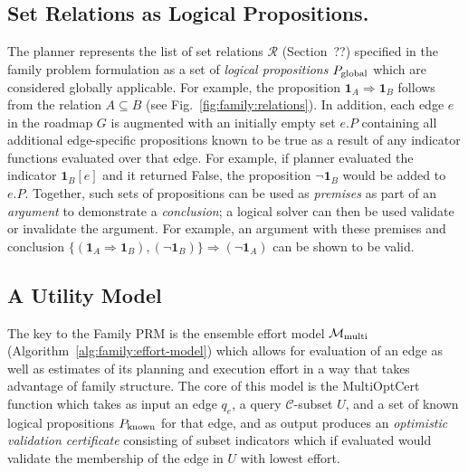 \subsection{Set Relations as Logical Propositions.}
The planner represents the list of set relations $\mathcal{R}$
(Section~??)
specified in the family problem formulation
as a set of \emph{logical propositions} $P_{\mbox{\scriptsize global}}$
which are considered globally applicable.
For example,
the proposition $\mathbf{1}_A \Rightarrow \mathbf{1}_B$
follows from the relation $A \subseteq B$
(see Fig.~\ref{fig:family:relations}).
In addition,
each edge $e$ in the roadmap $G$ is augmented with an initially empty
set $e.P$ containing all additional edge-specific propositions
known to be true as a result of any indicator functions evaluated
over that edge.
For example,
if planner evaluated the indicator $\mathbf{1}_B[e]$
and it returned False,
the proposition $\lnot\mathbf{1}_B$ would be added to $e.P$.
Together, such sets of propositions can be used as \emph{premises}
as part of an \emph{argument} to demonstrate a \emph{conclusion};
a logical solver can then be used validate or invalidate the argument.
For example, an argument with these premises and conclusion
$\{ (\mathbf{1}_A \Rightarrow \mathbf{1}_B), (\lnot\mathbf{1}_B) \}
\Rightarrow (\lnot\mathbf{1}_A)$
can be shown to be valid.

\subsection{A Utility Model}

The key to the Family PRM is the ensemble effort model
$\mathcal{M}_{\mbox{\scriptsize multi}}$
(Algorithm~\ref{alg:family:effort-model})
which allows for evaluation of an edge
as well as estimates of its planning and execution effort
in a way that takes advantage of family structure.
The core of this model is the {\sc MultiOptCert} function
which takes as input an edge $q_e$,
a query $\mathcal{C}$-subset $U$,
and a set of known logical propositions $P_{\mbox{\scriptsize known}}$
for that edge,
and as output produces an \emph{optimistic validation certificate}
consisting of subset indicators which if evaluated would
validate the membership of the edge in $U$ with lowest effort.

